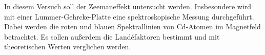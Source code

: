 In diesem Versuch soll der Zeemaneffekt untersucht werden. Insbesondere wird mit einer Lummer-Gehrcke-Platte eine spektroskopische
Messung durchgeführt. Dabei werden die roten und blauen Spektrallinien von Cd-Atomen im Magnetfeld betrachtet.
Es sollen außerdem die Landéfaktoren bestimmt und mit theoretischen Werten verglichen werden.
